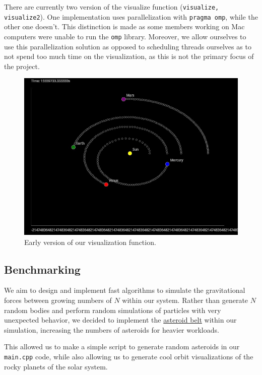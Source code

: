 \documentclass{article}
\begin{document}
There are currently two version of the visualize function (\texttt{visualize, visualize2}). One implementation uses parallelization with \texttt{pragma omp}, while the other one doesn't. This distinction is made as some members working on Mac computers were unable to run the \texttt{omp} library. Moreover, we allow ourselves to use this parallelization solution as opposed to scheduling threads ourselves as to not spend too much time on the visualization, as this is not the primary focus of the project. 

\begin{figure}[h]
    \centering
    \includegraphics[scale=0.5]{screenshot.jpg}
    \caption{Early version of our visualization function.}
\end{figure}

\subsection{Benchmarking}

We aim to design and implement fast algorithms to simulate the gravitational forces between growing numbers of $N$ within our system. Rather than generate $N$ random bodies and perform random simulations of particles with very unexpected behavior, we decided to implement the \href{https://en.wikipedia.org/wiki/Asteroid_belt}{asteroid belt} within our simulation, increasing the numbers of asteroids for heavier workloads.

This allowed us to make a simple script to generate random asteroids in our \texttt{main.cpp} code, while also allowing us to generate cool orbit visualizations of the rocky planets of the solar system. 
\end{document}
